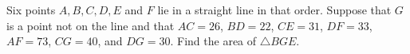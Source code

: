 Six points $A, B, C, D, E$ and $F$ lie in a straight line in that order. Suppose that $G$ is a point not on the line and that $AC = 26$, $BD = 22$, $CE = 31$, $DF = 33$, $AF = 73$, $CG = 40$, and $DG = 30$. Find the area of $\triangle BGE$.
